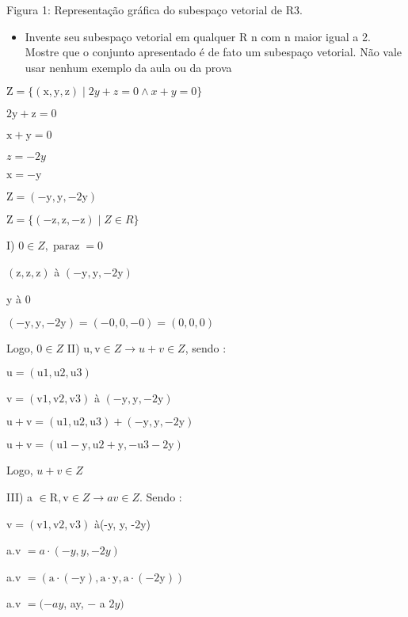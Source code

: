 \documentclass[10pt]{article}
\begin{document}
Figura 1: Representação gráfica do subespaço vetorial de R3.

\begin{itemize}
  \item Invente seu subespaço vetorial em qualquer $\mathrm{R}$ n com $\mathrm{n}$ maior igual a 2. Mostre que o conjunto apresentado é de fato um subespaço vetorial. Não vale usar nenhum exemplo da aula ou da prova
\end{itemize}
$\mathrm{Z}=\{(\mathrm{x}, \mathrm{y}, \mathrm{z}) \mid 2 y+z=0 \wedge x+y=0\}$

$2 \mathrm{y}+\mathrm{z}=0$

$\mathrm{x}+\mathrm{y}=0$

$z=-2 y$

$\mathrm{x}=-\mathrm{y}$

$\mathrm{Z}=(-\mathrm{y}, \mathrm{y},-2 \mathrm{y})$

$\mathrm{Z}=\{(-\mathrm{z}, \mathrm{z},-\mathrm{z}) \mid Z \in R\}$

I) $0 \in Z, \operatorname{paraz}=0$

$(\mathrm{z}, \mathrm{z}, \mathrm{z})$ à $(-\mathrm{y}, \mathrm{y},-2 \mathrm{y})$

y à 0

$(-\mathrm{y}, \mathrm{y},-2 \mathrm{y})=(-0,0,-0)=(0,0,0)$

Logo, $0 \in Z$ II) $\mathrm{u}, \mathrm{v} \in Z \rightarrow u+v \in Z$, sendo :

$\mathrm{u}=(\mathrm{u} 1, \mathrm{u} 2, \mathrm{u} 3)$

$\mathrm{v}=(\mathrm{v} 1, \mathrm{v} 2, \mathrm{v} 3)$ à $(-\mathrm{y}, \mathrm{y},-2 \mathrm{y})$

$\mathrm{u}+\mathrm{v}=(\mathrm{u} 1, \mathrm{u} 2, \mathrm{u} 3)+(-\mathrm{y}, \mathrm{y},-2 \mathrm{y})$

$\mathrm{u}+\mathrm{v}=(\mathrm{u} 1-\mathrm{y}, \mathrm{u} 2+\mathrm{y},-\mathrm{u} 3-2 \mathrm{y})$

Logo, $u+v \in Z$

III) a $\in \mathrm{R}, \mathrm{v} \in Z \rightarrow a v \in Z$. Sendo :

$\mathrm{v}=(\mathrm{v} 1, \mathrm{v} 2, \mathrm{v} 3)$ à(-y, y, -2y)

a.v $=a \cdot(-y, y,-2 y)$

a.v $=(\mathrm{a} \cdot(-\mathrm{y}), \mathrm{a} \cdot \mathrm{y}, \mathrm{a} \cdot(-2 \mathrm{y}))$

a.v $=(-a y$, ay, $-$ a $2 y)$
\end{document}
